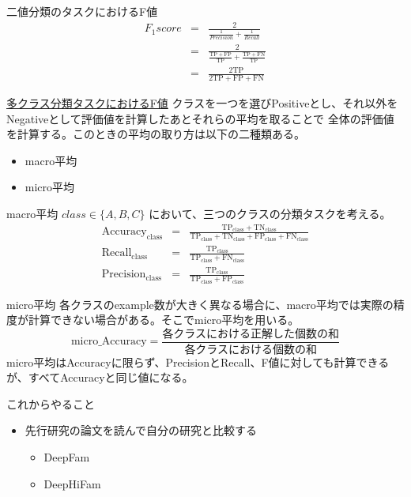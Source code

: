 \documentclass[leno,xcolor=dvipsnames]{beamer}
\begin{document}
  \begin{frame}{二値分類のタスクにおけるF値}
    \begin{eqnarray*}
      F_1score 
      &=& \frac{2}{\frac{1}{Precision} + \frac{1}{Recall}} \\
      &=& \frac{2}{\frac{\mathrm{TP} + \mathrm{FP}}{\mathrm{TP}} + \frac{\mathrm{TP} + \mathrm{FN}}{\mathrm{TP}}} \\
      &=& \frac{2\mathrm{TP}}{2\mathrm{TP} + \mathrm{FP} + \mathrm{FN}}
    \end{eqnarray*}
  \end{frame}

  \begin{frame}{\href{https://qiita.com/jyori112/items/110596b4f04e4e1a3c9b}{多クラス分類タスクにおけるF値}}
    クラスを一つを選びPositiveとし、それ以外をNegativeとして評価値を計算したあとそれらの平均を取ることで
    全体の評価値を計算する。このときの平均の取り方は以下の二種類ある。
    \begin{itemize}
      \item macro平均 
      \item micro平均 
    \end{itemize}
  \end{frame}

  \begin{frame}{macro平均}
    $class \in \{A, B, C\}$ において、三つのクラスの分類タスクを考える。
    \begin{eqnarray*}
      \mathrm{Accuracy}_{\mathrm{class}} &=& \frac{\mathrm{TP}_{\mathrm{class}} + \mathrm{TN}_{\mathrm{class}}}{\mathrm{TP}_{\mathrm{class}} + \mathrm{TN}_{\mathrm{class}} + \mathrm{FP}_{\mathrm{class}} + \mathrm{FN}_{\mathrm{class}}} \\
      \mathrm{Recall}_{\mathrm{class}} &=& \frac{\mathrm{TP}_{\mathrm{class}}}{\mathrm{TP}_{\mathrm{class}} + \mathrm{FN}_{\mathrm{class}}} \\
      \mathrm{Precision}_{\mathrm{class}} &=& \frac{\mathrm{TP}_{\mathrm{class}}}{\mathrm{TP}_{\mathrm{class}} + \mathrm{FP}_{\mathrm{class}}}
    \end{eqnarray*}
  \end{frame}

  \begin{frame}{micro平均}
    各クラスのexample数が大きく異なる場合に、macro平均では実際の精度が計算できない場合がある。そこでmicro平均を用いる。
    \begin{equation*}
      \mathrm{micro\_Accuracy} = \frac{\text{各クラスにおける正解した個数の和}}{\text{各クラスにおける個数の和}}
    \end{equation*}
    micro平均はAccuracyに限らず、PrecisionとRecall、F値に対しても計算できるが、すべてAccuracyと同じ値になる。
  \end{frame}

  \begin{frame}{これからやること}
    \begin{itemize}
      \item 先行研究の論文を読んで自分の研究と比較する
      \begin{itemize}
        \item DeepFam
        \item DeepHiFam
      \end{itemize}
    \end{itemize}
  \end{frame}
\end{document}
